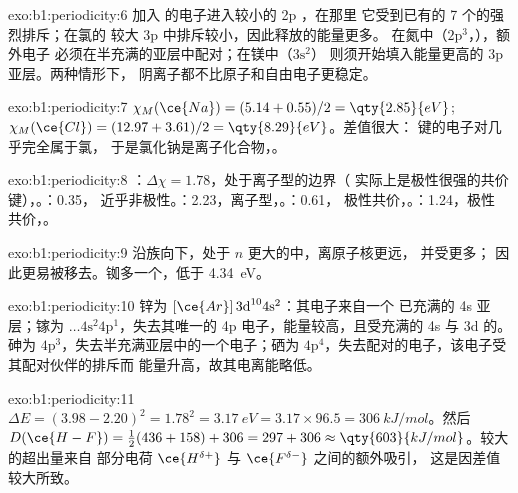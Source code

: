 \begin{solution}{exo:b1:periodicity:6}
加入  的电子进入较小的 2p ，在那里
它受到已有的 7 个的强烈排斥；在氯的
较大 3p 中排斥较小，因此释放的能量更多。
在氮中（$2\text{p}^3$，），额外电子
必须在半充满的亚层中配对；在镁中（$3\text{s}^2$）
则须开始填入能量更高的 3p 亚层。两种情形下，
阴离子都不比原子和自由电子更稳定。
\end{solution}

\begin{solution}{exo:b1:periodicity:7}
$\chi_M(\ce{Na}) = (5.14 + 0.55)/2 = \qty{2.85}{eV}$; $\chi_M(\ce{Cl}) =
(12.97 + 3.61)/2 = \qty{8.29}{eV}$。差值很大：
 键的电子对几乎完全属于氯，
于是氯化钠是离子化合物，。
\end{solution}

\begin{solution}{exo:b1:periodicity:8}
：$\Delta\chi = 1.78$，处于离子型的边界（
实际上是极性很强的共价键），。：0.35，
近乎非极性。：2.23，离子型，。：0.61，
极性共价，。：1.24，极性
共价，。
\end{solution}

\begin{solution}{exo:b1:periodicity:9}
沿族向下，处于 $n$ 更大的中，离原子核更远，
并受更多；
因此更易被移去。铷多一个，低于
\qty{4.34}{eV}。
\end{solution}

\begin{solution}{exo:b1:periodicity:10}
锌为 $[\ce{Ar}]\,3\text{d}^{10} 4\text{s}^2$：其电子来自一个
已充满的 4s 亚层；镓为 $\dots 4\text{s}^2 4\text{p}^1$，失去其唯一的
4p 电子，能量较高，且受充满的 4s 与 3d 的。砷为
$4\text{p}^3$，失去半充满亚层中的一个电子；硒为
$4\text{p}^4$，失去配对的电子，该电子受其配对伙伴的排斥而
能量升高，故其电离能略低。
\end{solution}

\begin{solution}{exo:b1:periodicity:11}
$\Delta E = (3.98 - 2.20)^2 = 1.78^2 = \qty{3.17}{eV} = 3.17 \times 96.5 =
\qty{306}{kJ/mol}$。然后 $D(\ce{H-F}) = \tfrac12(436 + 158) + 306 = 297 +
306 \approx \qty{603}{kJ/mol}$。较大的超出量来自
部分电荷 $\ce{H^{\delta+}}$ 与 $\ce{F^{\delta-}}$ 之间的额外吸引，
这是因差值较大所致。
\end{solution}

